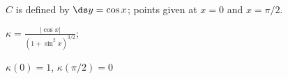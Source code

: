 {$C$ is defined by $\ds y = \cos x$; points given at $x=0$ and $x=\pi/2$. 
}
{$\kappa = \frac{|\cos x|}{\left(1+\sin^2x\right)^{3/2}}$;

$\kappa(0) = 1$, $\kappa(\pi/2) = 0$
}
